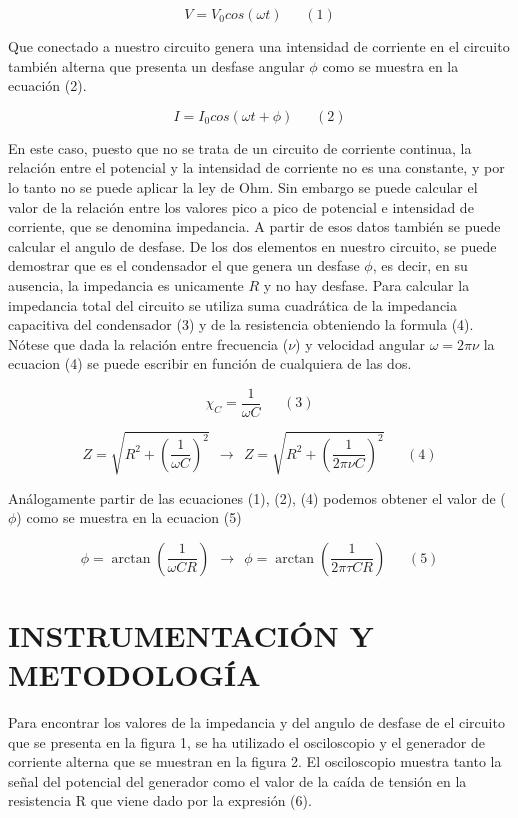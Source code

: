\documentclass[article, 11pt]{report}
\begin{document}
	$$ V = V_0 cos (\omega t ) ~~~~~~~(1)$$
	 
	Que conectado a nuestro circuito genera una intensidad de corriente en el circuito también alterna que presenta un desfase angular $\phi$ como se muestra en la ecuación (2).
	
	$$ I = I_0 cos(\omega t + \phi)  ~~~~~~~(2)$$
	
	En este caso, puesto que no se trata de un circuito de corriente continua, la relación entre el potencial y la intensidad de corriente no es una constante, y por lo tanto no se puede aplicar la ley de Ohm. Sin embargo se puede calcular el valor de la relación entre los valores pico a pico de potencial e intensidad de corriente, que se denomina impedancia. A partir de esos datos también se puede calcular el angulo de desfase. De los dos elementos en nuestro circuito, se puede demostrar que es el condensador el que genera un desfase $\phi$, es decir, en su ausencia, la impedancia es unicamente $R$ y no hay desfase. Para calcular la impedancia total del circuito se utiliza suma cuadrática de la impedancia capacitiva del condensador (3) y de la resistencia obteniendo la formula (4).	Nótese que dada la relación entre frecuencia ($\nu$) y velocidad angular $\omega = 2 \pi \nu$ la ecuacion (4) se puede escribir en función de cualquiera de las dos. 
	
	
	 $$ \chi_C = \frac{1}{\omega C}  ~~~~~~~(3)$$
	 
	 $$ Z = \sqrt{R^2 + (\dfrac{1}{\omega C})^2} ~~ \rightarrow ~~ Z = \sqrt{R^2 + (\dfrac{1}{2 \pi \nu C})^2}  ~~~~~~~(4)$$
	
	
Análogamente partir de las ecuaciones (1), (2), (4) podemos obtener el valor de ($\phi$) como se muestra en la ecuacion (5)

$$ \phi = \arctan(\dfrac{1}{\omega C R})  ~~ \rightarrow ~~ \phi = \arctan (\dfrac{1}{2 \pi \tau C R})  ~~~~~~~(5)$$

\newpage
	
	\section{INSTRUMENTACIÓN Y METODOLOGÍA}
	
	Para encontrar los valores de la impedancia y del angulo de desfase de el circuito que se presenta en la figura 1, se ha utilizado el osciloscopio y el generador de corriente alterna que se muestran en la figura 2. El osciloscopio muestra tanto la señal del potencial del generador como el valor de la caída de tensión en la resistencia R que viene dado por la expresión (6).
	
\end{document}
